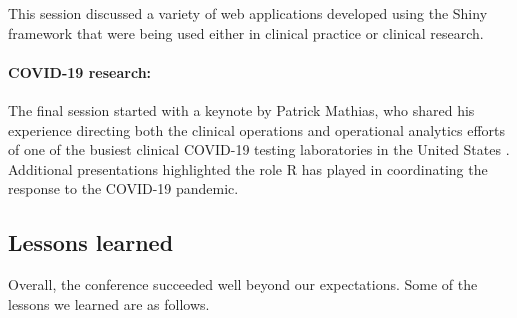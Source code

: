 This session discussed a variety of web applications developed using the
Shiny framework that were being used either in clinical practice or
clinical research.

\hypertarget{covid-19-research}{%
\paragraph{COVID-19 research:}\label{covid-19-research}}

The final session started with a keynote by Patrick Mathias, who shared
his experience directing both the clinical operations and operational
analytics efforts of one of the busiest clinical COVID-19 testing
laboratories in the United States \citep{covid}. Additional
presentations highlighted the role R has played in coordinating the
response to the COVID-19 pandemic.

\hypertarget{lessons-learned}{%
\subsection{Lessons learned}\label{lessons-learned}}

Overall, the conference succeeded well beyond our expectations. Some of
the lessons we learned are as follows.

